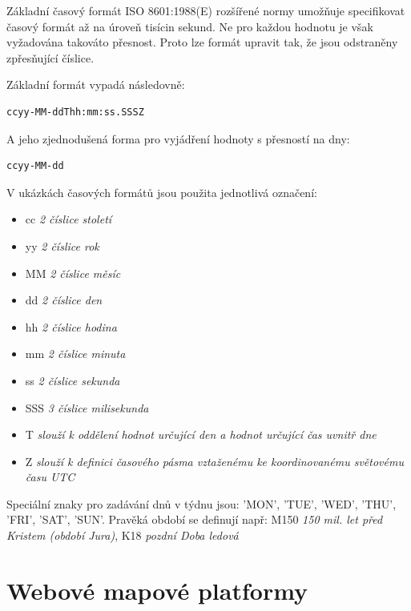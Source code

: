 Základní časový formát ISO 8601:1988(E) rozšířené normy umožňuje
specifikovat časový formát až na úroveň tisícin sekund. Ne pro každou
hodnotu je však vyžadována takováto přesnost. Proto lze formát upravit
tak, že jsou odstraněny zpřesňující číslice.

\noindent
Základní formát vypadá následovně:

\begin{verbatim}
ccyy-MM-ddThh:mm:ss.SSSZ
\end{verbatim}

\noindent
A jeho zjednodušená forma pro vyjádření hodnoty s přesností na dny:

\begin{verbatim}
ccyy-MM-dd
\end{verbatim}

\newpage
\noindent
V ukázkách časových formátů jsou použita jednotlivá označení:

\begin{itemize}
	\item cc \textit{2 číslice století}
	\item yy \textit{2 číslice rok}
	\item MM \textit{2 číslice měsíc}
	\item dd \textit{2 číslice den}
	\item hh \textit{2 číslice hodina}
	\item mm \textit{2 číslice minuta}
	\item ss \textit{2 číslice sekunda}
	\item SSS \textit{3 číslice milisekunda}
\end{itemize}

\begin{itemize}
	\item T \textit{slouží k oddělení hodnot určující den a hodnot určující čas uvnitř dne}
	\item Z \textit{slouží k definici časového pásma vztaženému ke koordinovanému světovému času UTC}
\end{itemize}

Speciální znaky pro zadávání dnů v týdnu jsou: 'MON', 'TUE', 'WED',
'THU', 'FRI', 'SAT', 'SUN'. Pravěká období se definují např: M150
\textit{150 mil. let před Kristem (období Jura)}, K18 \textit{pozdní
  Doba ledová}

\newpage
\section{Webové mapové platformy}

